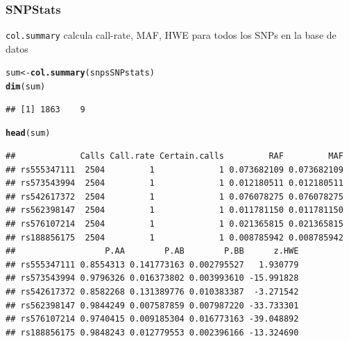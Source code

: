 \documentclass{beamer}\usepackage[]{graphicx}\usepackage[]{color}
\makeatletter
\newcommand{\hlnum}[1]{\textcolor[rgb]{0.686,0.059,0.569}{#1}}%
\newcommand{\hlopt}[1]{\textcolor[rgb]{0,0,0}{#1}}%
\newcommand{\hlstd}[1]{\textcolor[rgb]{0.345,0.345,0.345}{#1}}%
\newcommand{\hlkwb}[1]{\textcolor[rgb]{0.69,0.353,0.396}{#1}}%
\newcommand{\hlkwd}[1]{\textcolor[rgb]{0.737,0.353,0.396}{\textbf{#1}}}%
\newenvironment{kframe}{%
 \def\at@end@of@kframe{}%
 \ifinner\ifhmode%
  \def\at@end@of@kframe{\end{minipage}}%
  \begin{minipage}{\columnwidth}%
 \fi\fi%
 \def\FrameCommand##1{\hskip\@totalleftmargin \hskip-\fboxsep
 \colorbox{shadecolor}{##1}\hskip-\fboxsep
     \hskip-\linewidth \hskip-\@totalleftmargin \hskip\columnwidth}%
 \MakeFramed {\advance\hsize-\width
   \@totalleftmargin\z@ \linewidth\hsize
   \@setminipage}}%
 {\par\unskip\endMakeFramed%
 \at@end@of@kframe}
\newenvironment{knitrout}{}{} %
\makeatother
\begin{document}
\begin{frame}[fragile]
\frametitle{SNPStats}
{\tt col.summary} calcula call-rate, MAF, HWE para todos los SNPs en la base de datos
\begin{knitrout}\footnotesize
{}\color{fgcolor}\begin{kframe}
\begin{alltt}
\hlstd{sum} \hlkwb{<-} \hlkwd{col.summary}\hlstd{(snpsSNPstats)}
\hlkwd{dim}\hlstd{(sum)}
\end{alltt}
\begin{verbatim}
## [1] 1863    9
\end{verbatim}
\begin{alltt}
\hlkwd{head}\hlstd{(sum)}
\end{alltt}
\begin{verbatim}
##             Calls Call.rate Certain.calls         RAF         MAF
## rs555347111  2504         1             1 0.073682109 0.073682109
## rs573543994  2504         1             1 0.012180511 0.012180511
## rs542617372  2504         1             1 0.076078275 0.076078275
## rs562398147  2504         1             1 0.011781150 0.011781150
## rs576107214  2504         1             1 0.021365815 0.021365815
## rs188856175  2504         1             1 0.008785942 0.008785942
##                  P.AA        P.AB        P.BB      z.HWE
## rs555347111 0.8554313 0.141773163 0.002795527   1.930779
## rs573543994 0.9796326 0.016373802 0.003993610 -15.991828
## rs542617372 0.8582268 0.131389776 0.010383387  -3.271542
## rs562398147 0.9844249 0.007587859 0.007987220 -33.733301
## rs576107214 0.9740415 0.009185304 0.016773163 -39.048892
## rs188856175 0.9848243 0.012779553 0.002396166 -13.324690
\end{verbatim}
\end{kframe}
\end{knitrout}
\end{frame}

\end{document}
